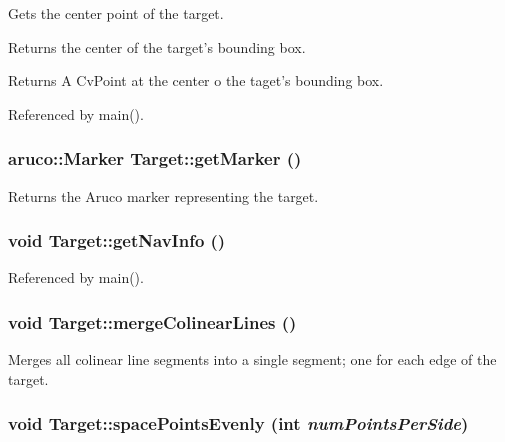 Gets the center point of the target. 

Returns the center of the target's bounding box. \begin{DoxyReturn}{Returns}
A CvPoint at the center o the taget's bounding box. 
\end{DoxyReturn}


Referenced by main().

\hypertarget{classTarget_ac639d54e469f2a463ef6e3c22261b108}{
\subsubsection[{getMarker}]{\setlength{\rightskip}{0pt plus 5cm}aruco::Marker Target::getMarker ()}}
\label{classTarget_ac639d54e469f2a463ef6e3c22261b108}


Returns the Aruco marker representing the target. 

\hypertarget{classTarget_a60f06174aec80a151a02ef5c6ef2735d}{
\subsubsection[{getNavInfo}]{\setlength{\rightskip}{0pt plus 5cm}void Target::getNavInfo ()}}
\label{classTarget_a60f06174aec80a151a02ef5c6ef2735d}


Referenced by main().

\hypertarget{classTarget_a5863d9c3708b47db4e2a2bd60723c9d4}{
\subsubsection[{mergeColinearLines}]{\setlength{\rightskip}{0pt plus 5cm}void Target::mergeColinearLines ()}}
\label{classTarget_a5863d9c3708b47db4e2a2bd60723c9d4}


Merges all colinear line segments into a single segment; one for each edge of the target. 

\hypertarget{classTarget_a11d364c4df4e83d475c33b4a4915a792}{
\subsubsection[{spacePointsEvenly}]{\setlength{\rightskip}{0pt plus 5cm}void Target::spacePointsEvenly (int {\em numPointsPerSide})}}
\label{classTarget_a11d364c4df4e83d475c33b4a4915a792}


